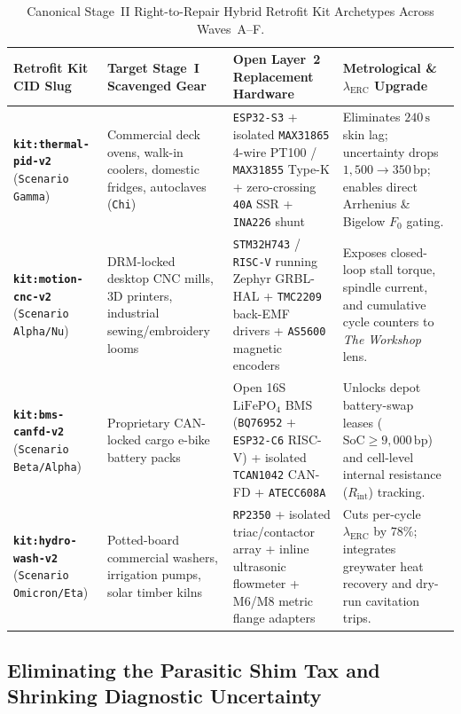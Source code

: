\begin{table}[htbp]
\centering
\caption{Canonical Stage~II Right-to-Repair Hybrid Retrofit Kit Archetypes Across Waves~A--F.}
\label{tab:l2-retrofit-kit-archetypes}
\footnotesize
\begin{tabular}{@{}p{2.6cm}p{2.7cm}p{4.3cm}p{4.1cm}@{}}
\toprule
\textbf{Retrofit Kit CID Slug} & \textbf{Target Stage~I Scavenged Gear} & \textbf{Open Layer~2 Replacement Hardware} & \textbf{Metrological \& $\lambda_{\mathrm{ERC}}$ Upgrade} \\
\midrule
\textbf{\texttt{kit:thermal-pid-v2}} (\texttt{Scenario Gamma}) & Commercial deck ovens, walk-in coolers, domestic fridges, autoclaves (\texttt{Chi}) & \texttt{ESP32-S3} + isolated \texttt{MAX31865} 4-wire PT100 / \texttt{MAX31855} Type-K + zero-crossing \texttt{40A} SSR + \texttt{INA226} shunt & Eliminates $240\,\mathrm{s}$ skin lag; uncertainty drops $1{,}500 \to 350\,\mathrm{bp}$; enables direct Arrhenius \& Bigelow $F_0$ gating. \\
\addlinespace[3pt]
\textbf{\texttt{kit:motion-cnc-v2}} (\texttt{Scenario Alpha/Nu}) & DRM-locked desktop CNC mills, 3D printers, industrial sewing/embroidery looms & \texttt{STM32H743} / \texttt{RISC-V} running Zephyr GRBL-HAL + \texttt{TMC2209} back-EMF drivers + \texttt{AS5600} magnetic encoders & Exposes closed-loop stall torque, spindle current, and cumulative cycle counters to \textit{The Workshop} lens. \\
\addlinespace[3pt]
\textbf{\texttt{kit:bms-canfd-v2}} (\texttt{Scenario Beta/Alpha}) & Proprietary CAN-locked cargo e-bike battery packs & Open 16S $\mathrm{LiFePO_4}$ BMS (\texttt{BQ76952} + \texttt{ESP32-C6} RISC-V) + isolated \texttt{TCAN1042} CAN-FD + \texttt{ATECC608A} & Unlocks depot battery-swap leases ($\mathrm{SoC} \ge 9{,}000\,\mathrm{bp}$) and cell-level internal resistance ($R_{\mathrm{int}}$) tracking. \\
\addlinespace[3pt]
\textbf{\texttt{kit:hydro-wash-v2}} (\texttt{Scenario Omicron/Eta}) & Potted-board commercial washers, irrigation pumps, solar timber kilns & \texttt{RP2350} + isolated triac/contactor array + inline ultrasonic flowmeter + M6/M8 metric flange adapters & Cuts per-cycle $\lambda_{\mathrm{ERC}}$ by $78\%$; integrates greywater heat recovery and dry-run cavitation trips. \\
\bottomrule
\end{tabular}
\end{table}

\subsection{Eliminating the Parasitic Shim Tax and Shrinking Diagnostic Uncertainty}

